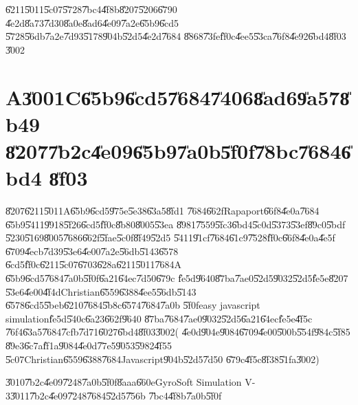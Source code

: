 \U{6211}\U{5011}\U{5c07}\U{5728}\U{7bc4}\U{4f8b}\U{8207}\U{5206}\U{6790}%
\U{4e2d}\U{8a73}\U{7d30}\U{8a0e}\U{8ad6}\U{4e09}\U{7a2e}\U{65b9}\U{6cd5}%
\U{5728}\U{56db}\U{7a2e}\U{7d93}\U{5178}\U{904b}\U{52d5}\U{4e2d}\U{7684}%
\U{8868}\U{73fe}\U{ff0c}\U{4ee5}\U{53ca}\U{76f8}\U{4e92}\U{6bd4}\U{8f03}%
\U{3002}

\section{A\U{3001}C\U{65b9}\U{6cd5}\U{7684}\U{7406}\U{8ad6}\U{9a57}\U{8b49}%
\U{8207}\U{7b2c}\U{4e09}\U{65b9}\U{7a0b}\U{5f0f}\U{78bc}\U{7684}\U{6bd4}%
\U{8f03}}

\U{8207}\U{6211}\U{5011}A\U{65b9}\U{6cd5}\U{975e}\U{5e38}\U{63a5}\U{8fd1}%
\U{7684}\U{662f}Rapaport\U{66f8}\U{4e0a}\cite[Page 232]{rapaport}\U{7684}%
\U{65b9}\U{5411}\U{9918}\U{5f26}\U{6cd5}\U{ff0c}\U{8b80}\U{8005}\U{53ea}%
\U{8981}\U{7559}\U{5fc3}\U{6bd4}\U{5c0d}\U{5373}\U{53ef}\U{89c0}\U{5bdf}%
\U{5230}\U{5169}\U{8005}\U{7686}\U{662f}\U{5fae}\U{5c0f}\U{8f49}\U{52d5}%
\U{5411}\U{91cf}\U{7684}\U{61c9}\U{7528}\U{ff0c}\U{66f8}\U{4e0a}\U{4e5f}%
\U{6709}\U{4ecb}\U{7d39}\U{53e6}\U{4e00}\U{7a2e}\U{56db}\U{5143}\U{6578}%
\U{6cd5}\U{ff0c}\U{6211}\U{5c07}\U{6703}\U{628a}\U{6211}\U{5011}\U{7684}A%
\U{65b9}\U{6cd5}\U{7684}\U{7a0b}\U{5f0f}\U{6a21}\U{64ec}\U{7d50}\U{679c}%
\U{fe5d}\U{9640}\U{87ba}\U{7ae0}\U{52d5}\U{9032}\U{52d5}\U{fe5e}\U{8207}%
\U{53e6}\U{4e00}\U{4f4d}Christian\U{6559}\U{6388}\U{4ee5}\U{56db}\U{5143}%
\U{6578}\U{6cd5}\U{5beb}\U{6210}\U{7684}\U{5b8c}\U{6574}\U{7684}\U{7a0b}%
\U{5f0f}easy javascript simulation\U{fe5d}\U{540c}\U{6a23}\U{662f}\U{9640}%
\U{87ba}\U{7684}\U{7ae0}\U{9032}\U{52d5}\U{6a21}\U{64ec}\U{fe5e}\U{4f5c}%
\U{76f4}\U{63a5}\U{7684}\U{7cfb}\U{7d71}\U{6027}\U{6bd4}\U{8f03}\U{3002}(%
\U{4e0d}\U{904e}\U{9084}\U{6709}\U{4e00}\U{500b}\U{554f}\U{984c}\U{5f85}%
\U{89e3}\U{6c7a}\U{ff1a}\U{9084}\U{4e0d}\U{77e5}\U{9053}\U{5982}\U{4f55}%
\U{5c07}Christian\U{6559}\U{6388}\U{7684}Javascript\U{904b}\U{52d5}\U{7d50}%
\U{679c}\U{4f5c}\U{8f38}\U{51fa}\U{3002})

\bigskip

\U{3010}\U{7b2c}\U{4e09}\U{7248}\U{7a0b}\U{5f0f}\U{8aaa}\U{660e}GyroSoft
Simulation V-3\U{3011}\U{7b2c}\U{4e09}\U{7248}\U{7684}\U{52d5}\U{756b}%
\U{7bc4}\U{4f8b}\U{7a0b}\U{5f0f}

\begin{mdframed}[leftline=false, rightline=false,backgroundcolor=bg]
\inputminted[linenos,fontsize=\footnotesize]{python}{../../Scripts/cordtrans/opengltest/cubegyro_opengl_animation_1.py}
\end{mdframed}%

